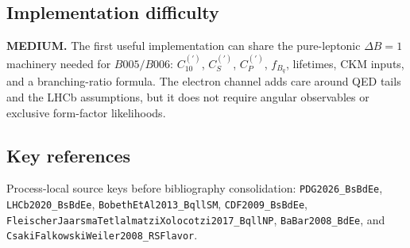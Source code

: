 \subsection*{Implementation difficulty}
\textbf{MEDIUM.}  The first useful implementation can share the pure-leptonic
\(\Delta B=1\) machinery needed for \(B005/B006\): \(C_{10}^{(\prime)}\),
\(C_S^{(\prime)}\), \(C_P^{(\prime)}\), \(f_{B_q}\), lifetimes, CKM inputs, and
a branching-ratio formula.  The electron channel adds care around QED tails and
the LHCb assumptions, but it does not require angular observables or exclusive
form-factor likelihoods.

\subsection*{Key references}
Process-local source keys before bibliography consolidation:
\texttt{PDG2026\_BsBdEe}, \texttt{LHCb2020\_BsBdEe},
\texttt{BobethEtAl2013\_BqllSM},
\texttt{CDF2009\_BsBdEe},
\texttt{FleischerJaarsmaTetlalmatziXolocotzi2017\_BqllNP},
\texttt{BaBar2008\_BdEe}, and
\texttt{CsakiFalkowskiWeiler2008\_RSFlavor}.
